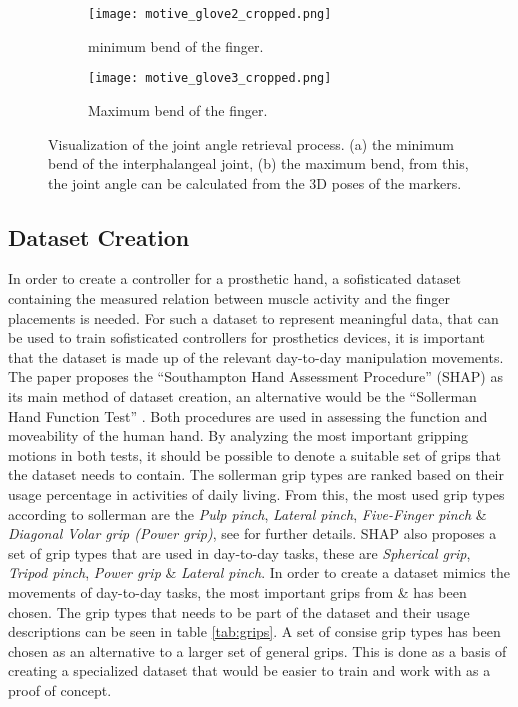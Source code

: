 \documentclass[../main.tex]{subfiles}
\begin{document}
\begin{figure}[H]
    \begin{subfigure}[b]{0.49\textwidth}
        \centering
        \texttt{[image: motive\_glove2\_cropped.png]}
        \caption{minimum bend of the finger.}
        \label{fig:minbend}
    \end{subfigure}
    \hfill
    \begin{subfigure}[b]{0.49\textwidth}
        \centering
        \texttt{[image: motive\_glove3\_cropped.png]}
        \caption{Maximum bend of the finger.}
        \label{fig:maxbend}
    \end{subfigure}
    \caption{Visualization of the joint angle retrieval process. (a) the minimum bend of the \gls{interphalangeal joint}, (b) the maximum bend, from this, the joint angle can be calculated from the 3D poses of the markers.}
\end{figure}

\subsection{Dataset Creation}
\label{sec:dataset}

In order to create a controller for a prosthetic hand, a sofisticated dataset containing the measured relation between muscle activity and the finger placements is needed.
For such a dataset to represent meaningful data, that can be used to train sofisticated controllers for prosthetics devices, it is important that the dataset is made up of the relevant day-to-day manipulation movements.
The paper \cite{KeunTaeKim2021} proposes the ``Southampton Hand Assessment Procedure'' (SHAP) \cite{shap} as its main method of dataset creation, an alternative would be the ``Sollerman Hand  Function Test''  \cite{sollerman}.
Both procedures are used in assessing the function and moveability of the human hand.
By analyzing the most important gripping motions in both tests, it should be possible to denote a suitable set of grips that the dataset needs to contain.
The sollerman grip types are ranked based on their usage percentage in activities of daily living.
From this, the most used grip types according to sollerman are the \textit{Pulp pinch}, \textit{Lateral pinch}, \textit{Five-Finger pinch} \& \textit{Diagonal Volar grip (Power grip)}, see \cite{sollerman} for further details.
SHAP also proposes a set of grip types that are used in day-to-day tasks, these are \textit{Spherical grip}, \textit{Tripod pinch}, \textit{Power grip} \& \textit{Lateral pinch}.
In order to create a dataset mimics the movements of day-to-day tasks, the most important grips from \cite{sollerman} \& \cite{shap} has been chosen.
The grip types that needs to be part of the dataset and their usage descriptions can be seen in table \ref{tab:grips}.
A set of consise grip types has been chosen as an alternative to a larger set of general grips.
This is done as a basis of creating a specialized dataset that would be easier to train and work with as a proof of concept.
\end{document}
